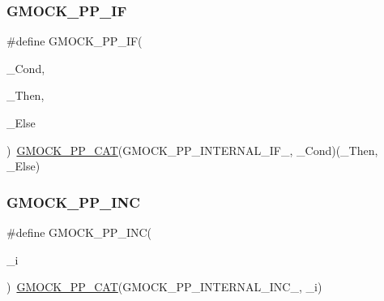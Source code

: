 \mbox{\label{_obj__test_2lib_2googletest-master_2googlemock_2include_2gmock_2internal_2gmock-pp_8h_a82f153fedbaf56bf71b8272bdf672875}} 
\subsubsection{\texorpdfstring{GMOCK\_PP\_IF}{GMOCK\_PP\_IF}}
{\footnotesize\ttfamily \#define G\+M\+O\+C\+K\+\_\+\+P\+P\+\_\+\+IF(\begin{DoxyParamCaption}\item[{}]{\+\_\+\+Cond,  }\item[{}]{\+\_\+\+Then,  }\item[{}]{\+\_\+\+Else }\end{DoxyParamCaption})~\mbox{\hyperlink{_obj__test_2lib_2googletest-master_2googlemock_2include_2gmock_2internal_2gmock-pp_8h_a108c52ffa81ab99348d23b8fa76fded3}{G\+M\+O\+C\+K\+\_\+\+P\+P\+\_\+\+C\+AT}}(G\+M\+O\+C\+K\+\_\+\+P\+P\+\_\+\+I\+N\+T\+E\+R\+N\+A\+L\+\_\+\+I\+F\+\_\+, \+\_\+\+Cond)(\+\_\+\+Then, \+\_\+\+Else)}

\mbox{\label{_obj__test_2lib_2googletest-master_2googlemock_2include_2gmock_2internal_2gmock-pp_8h_abcffb7b948f0eed30aa35ba3c1e77299}} 
\subsubsection{\texorpdfstring{GMOCK\_PP\_INC}{GMOCK\_PP\_INC}}
{\footnotesize\ttfamily \#define G\+M\+O\+C\+K\+\_\+\+P\+P\+\_\+\+I\+NC(\begin{DoxyParamCaption}\item[{}]{\+\_\+i }\end{DoxyParamCaption})~\mbox{\hyperlink{_obj__test_2lib_2googletest-master_2googlemock_2include_2gmock_2internal_2gmock-pp_8h_a108c52ffa81ab99348d23b8fa76fded3}{G\+M\+O\+C\+K\+\_\+\+P\+P\+\_\+\+C\+AT}}(G\+M\+O\+C\+K\+\_\+\+P\+P\+\_\+\+I\+N\+T\+E\+R\+N\+A\+L\+\_\+\+I\+N\+C\+\_\+, \+\_\+i)}

\mbox{\label{_obj__test_2lib_2googletest-master_2googlemock_2include_2gmock_2internal_2gmock-pp_8h_a7a4a2a8606d20424b0ec1db4236819e4}} 
